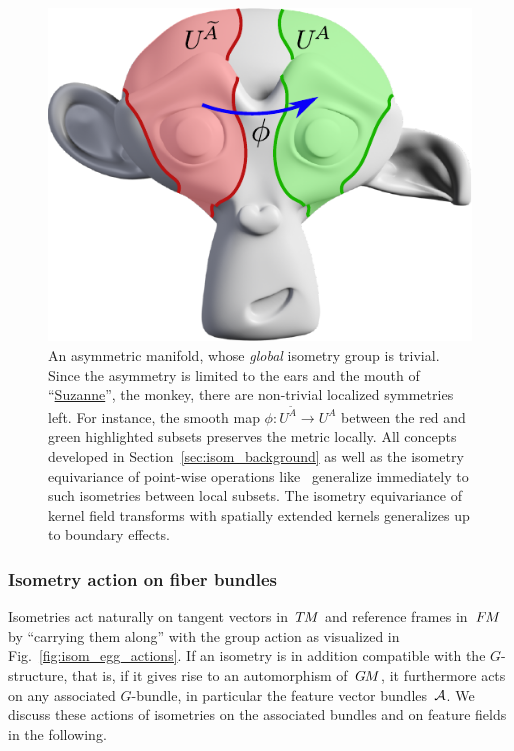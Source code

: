 \begin{figure}
    \centering
    \hspace{1.ex}
    \includegraphics[width=.42\textwidth]{figures/suzanne_local_isometry.pdf}
    \hspace{2.ex}
    \captionsetup{width=.89\textwidth}
    \caption[]{\small
        An asymmetric manifold, whose \emph{global} isometry group is trivial.
        Since the asymmetry is limited to the ears and the mouth of
        ``\href{https://en.wikipedia.org/wiki/Blender_(software)\#Suzanne}{Suzanne}'',
        the monkey, there are non-trivial localized symmetries left.
        For instance, the smooth map ${\phi: U^{\widetilde{A}} \to U^A}$ between the red and green highlighted subsets preserves the metric locally.
        All concepts developed in Section~\ref{sec:isom_background} as well as the isometry equivariance of point-wise operations like \onexones\ generalize immediately to such isometries between local subsets. 
        The isometry equivariance of kernel field transforms with spatially extended kernels generalizes up to boundary effects.
        }
    \label{fig:suzanne_local_isometry}
\end{figure}











\subsubsection{Isometry action on fiber bundles}
\label{sec:isom_action_bundles}

Isometries act naturally on tangent vectors in~$T\mkern-1.5muM$ and reference frames in~$F\mkern-1.5muM$ by ``carrying them along'' with the group action as visualized in Fig.~\ref{fig:isom_egg_actions}.
If an isometry is in addition compatible with the $G$-structure, that is, if it gives rise to an automorphism of~$G\mkern-1.4muM$, it furthermore acts on any associated $G$-bundle, in particular the feature vector bundles~$\mathcal{A}$.
We discuss these actions of isometries on the associated bundles and on feature fields in the following.



